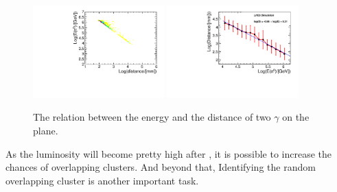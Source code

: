 \begin{figure}[!htbp]
\centering
\includegraphics[width=0.45\textwidth]{Figures/06_ECAL/pi0_plots/distance_E.pdf}
\includegraphics[width=0.45\textwidth]{Figures/06_ECAL/pi0_plots/distance_E_1D.pdf}
\caption{The relation between the \piz energy and the distance of two $\gamma$ on the \ecal plane.} 
\label{fig:pi0_distance_E}
\end{figure}

As the luminosity will become pretty high after \upgradetwo, 
it is possible to increase the chances of overlapping clusters.
And beyond that,
Identifying the random overlapping cluster is another important task.


